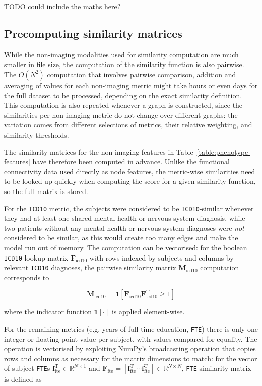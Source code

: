 TODO could include the maths here?

\subsection{Precomputing similarity matrices}
While the non-imaging modalities used for similarity computation are much smaller in file size, the computation of the similarity function is also pairwise. The $O(N^2)$ computation that involves pairwise comparison, addition and averaging of values for each non-imaging metric might take hours or even days for the full dataset to be processed, depending on the exact similarity definition. This computation is also repeated whenever a graph is constructed, since the similarities per non-imaging metric do not change over different graphs: the variation comes from different selections of metrics, their relative weighting, and similarity thresholds.

The similarity matrices for the non-imaging features in Table~\ref{table:phenotype-features} have therefore been computed in advance. Unlike the functional connectivity data used directly as node features, the metric-wise similarities need to be looked up quickly when computing the score for a given similarity function, so the full matrix is stored.


For the \texttt{ICD10} metric, the subjects were considered to be \texttt{ICD10}-similar whenever they had at least one shared mental health or nervous system diagnosis, while two patients without any mental health or nervous system diagnoses were \textit{not} considered to be similar, as this would create too many edges and make the model run out of memory. The computation can be vectorised: for the boolean \texttt{ICD10}-lookup matrix $\mathbf{F}_{\text{icd10}}$ with rows indexed by subjects and columns by relevant \texttt{ICD10} diagnoses, the pairwise similarity matrix $\mathbf{M}_{\text{icd10}}$ computation corresponds to 

\begin{equation}
    \mathbf{M}_{\text{icd10}} = \mathbf{1}\left[\mathbf{F}_{\text{icd10}}^{\ }\mathbf{F}_{\text{icd10}}^{\mathrm{T}} \geq 1\right]
\end{equation}

where the indicator function $\mathbf{1}[\cdot]$ is applied element-wise.

For the remaining metrics (e.g. years of full-time education, \texttt{FTE}) there is only one integer or floating-point value per subject, with values  compared for equality. The operation is vectorised by exploiting NumPy's broadcasting operation that copies rows and columns as necessary for the matrix dimensions to match: for the vector of subject \texttt{FTE}s $\mathbf{f}_{\text{fte}}^{\mathrm{T}} \in \mathbb{R}^{N \times 1}$ and $\mathbf{F}_{\text{fte}} = [\mathbf{f}_{\text{fte}}^{\mathrm{T}} \cdots \mathbf{f}_{\text{fte}}^{\mathrm{T}}] \in \mathbb{R}^{N \times N}$, \texttt{FTE}-similarity matrix is defined as

